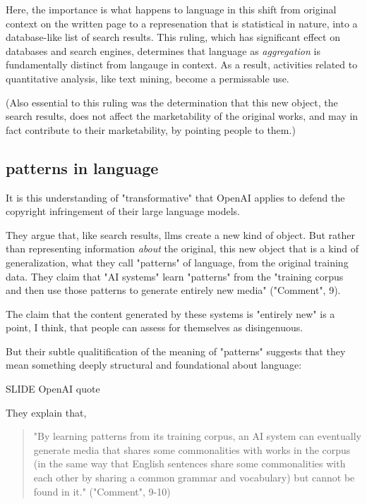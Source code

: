 \documentclass[11pt]{article}
\begin{document}
Here, the importance is what happens to language in this shift from
original context on the written page to a represenation that is
statistical in nature, into a database-like list of search results.
This ruling, which has significant effect on databases and search
engines, determines that language as \emph{aggregation} is fundamentally
distinct from langauge in context. As a result, activities related to
quantitative analysis, like text mining, become a permissable use.

(Also essential to this ruling was the determination that this new
object, the search results, does not affect the marketability of the
original works, and may in fact contribute to their marketability, by
pointing people to them.)

\subsection{patterns in language}
\label{sec:org0b5cf96}

It is this understanding of "transformative" that OpenAI applies to
defend the copyright infringement of their large language models.

They argue that, like search results, llms create a new kind of
object. But rather than representing information \emph{about} the original,
this new object that is a kind of generalization, what they call
"patterns" of language, from the original training data. They claim
that "AI systems" learn "patterns" from the "training corpus and then
use those patterns to generate entirely new media" ("Comment", 9).

The claim that the content generated by these systems is "entirely
new" is a point, I think, that people can assess for themselves as
disingenuous.

But their subtle qualitification of the meaning of "patterns" suggests
that they mean something deeply structural and foundational about
language: 

SLIDE OpenAI quote

They explain that,

\begin{quote}
"By learning patterns from its training corpus, an AI system can
eventually generate media that shares some commonalities with works in
the corpus (in the same way that English sentences share some
commonalities with each other by sharing a common grammar and
vocabulary) but cannot be found in it." ("Comment", 9-10)
\end{quote}
\end{document}
